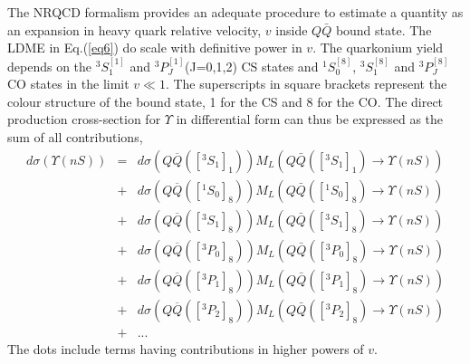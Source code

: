 The NRQCD formalism provides an adequate procedure to estimate a quantity as an expansion in 
heavy quark relative velocity, $v$ inside $Q\bar{Q}$ bound state. The LDME in Eq.(\ref{eq6})
do scale with definitive power in $v$. The quarkonium yield depends on the $^3S_1^{[1]}$ 
and $^3P_J^{[1]}$(J=0,1,2) CS states and $^1S_0^{[8]}$, $^3S_1^{[8]}$ and $^3P_J^{[8]}$
CO states in the limit $v\ll 1$.
The superscripts in square brackets represent the colour structure of the bound state,
1 for the CS and 8 for the CO. The direct production cross-section for 
$\Upsilon$ in differential form can thus be expressed as the sum of all contributions,
\begin{eqnarray}
  d\sigma(\Upsilon(nS)) &=& d\sigma(Q\overline{Q}([^3S_1]_{1}))
  M_{L}(Q\bar{Q}([^3S_1]_{1})\rightarrow \Upsilon(nS)) \nonumber \\
  &+& d\sigma(Q\overline{Q}([^1S_0]_{8}))
  M_{L}(Q\bar{Q}([^1S_0]_{8})\rightarrow \Upsilon(nS)) \nonumber \\ 
  &+& d\sigma(Q\overline{Q}([^3S_1]_{8}))
  M_{L}(Q\bar{Q}([^3S_1]_{8})\rightarrow \Upsilon(nS)) \nonumber \\
  &+& d\sigma(Q\overline{Q}([^3P_0]_{8}))
  M_{L}(Q\bar{Q}([^3P_0]_{8})\rightarrow \Upsilon(nS))  \nonumber \\
  &+& d\sigma(Q\overline{Q}([^3P_1]_{8}))
  M_{L}(Q\bar{Q}([^3P_1]_{8}) \rightarrow \Upsilon(nS)) \nonumber \\
  &+& d\sigma(Q\overline{Q}([^3P_2]_{8}))
  M_{L}(Q\bar{Q}([^3P_2]_{8})\rightarrow \Upsilon(nS)) \nonumber \\
  &+& ...
  \label{eq8}
\end{eqnarray}
The dots include terms having contributions in higher powers of $v$.



